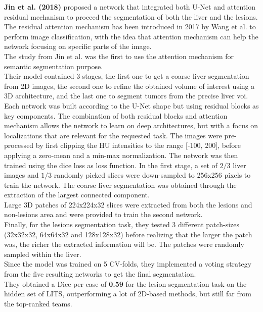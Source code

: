 \textbf{Jin et al. (2018)} proposed a network that integrated both U-Net
and attention residual mechanism to proceed the segmentation of both the
liver and the lesions.\\
The residual attention mechanism has been introduced in 2017 by
Wang et al. \cite{Wang2017}
to perform image classification, with the idea that attention mechanism
can help the network focusing on specific parts of the image.\\
The study from Jin et al. was the first to use the attention mechanism
for semantic segmentation purpose.\\
Their model contained 3 stages, the first one to get a coarse liver
segmentation from 2D images, the second one to refine the obtained
volume of interest using a 3D architecture, and the last one to segment
tumors from the precise liver \ac{voi}.\\
Each network was built according to the U-Net shape but using residual
blocks as key components. The combination of both residual blocks and
attention mechanism allows the network to learn on deep architectures,
but with a focus on localizations that are relevant for the requested
task.
The images were pre-processed by first clipping the HU intensities to
the range {[}-100, 200{]}, before applying a zero-mean and a min-max
normalization. The network was then trained using the dice loss as loss
function.
In the first stage, a set of $2/3$ liver images and $1/3$ randomly picked slices
were down-sampled to 256x256 pixels to train the network. The coarse
liver segmentation was obtained through the extraction of the largest
connected component.\\
Large 3D patches of 224x224x32 slices were extracted from both the
lesions and non-lesions area and were provided to train the second
network.\\
Finally, for the lesions segmentation task, they tested 3 different
patch-sizes (32x32x32, 64x64x32 and 128x128x32) before realizing that
the larger the patch was, the richer the extracted information will be.
The patches were randomly sampled within the liver.\\
Since the model was trained on 5 CV-folds, they implemented a voting
strategy from the five resulting networks to get the final segmentation.\\
They obtained a Dice per case of \textbf{0.59} for the lesion
segmentation task on the hidden set of LITS, outperforming a lot of
2D-based methods, but still far from the top-ranked teams.
